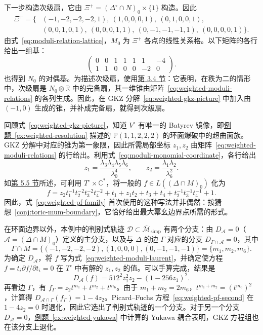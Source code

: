 \begin{example}
下一步构造次级扇，它由 $\Xi^+=(\Delta^\circ\cap N)_0\times\{1\}$ 构造。因此
\[
\begin{split}
\Xi^+=\{&(-1,-2,-2,-2,1),\ (1,0,0,0,1),\ (0,1,0,0,1),\\
&(0,0,1,0,1),\ (0,0,0,1,1),\ (0,-1,-1,-1,1),\ (0,0,0,0,1)\}.
\end{split}
\]
由式~\eqref{eq:moduli-relation-lattice}，$M_0$ 为 $\Xi^+$ 各点的线性关系格。以下矩阵的各行给出一组基：
\begin{equation}\label{eq:weighted-moduli-relations}
\begin{pmatrix}0&0&1&1&1&1&-4\\1&1&0&0&0&-2&0\end{pmatrix}.
\end{equation}
也得到 $N_0$ 的对偶基。为描述次级扇，使用\hyperref[sec:gkz-decomposition]{第 3.4 节}：它表明，在秩为二的情形中，次级扇是 $N_0\otimes\mathbb R$ 中的完备扇，其一维锥由矩阵~\eqref{eq:weighted-moduli-relations} 的各列生成。因此，在 GKZ 分解~\eqref{eq:weighted-gkz-picture} 中加入由 $(-1,0)$ 生成的锥，并补成完备扇，就得到次级扇。

回顾式~\eqref{eq:weighted-gkz-picture}，知道 $V^\circ$ 有唯一的 Batyrev 镜像，即\hyperref[ex:weighted-resolution]{例题~\ref*{ex:weighted-resolution}} 描述的 $\mathbb P(1,1,2,2,2)$ 的环面爆破中的超曲面族。GKZ 分解中对应的锥为第一象限，因此所需局部坐标 $z_1,z_2$ 由矩阵~\eqref{eq:weighted-moduli-relations} 的行给出。利用式~\eqref{eq:moduli-monomial-coordinate}，各行给出
\[
z_1=\frac{\lambda_3\lambda_4\lambda_5\lambda_6}{\lambda_0^4},\qquad
z_2=\frac{\lambda_1\lambda_2}{\lambda_6^2}.
\]
如\hyperref[sec:hypergeometric]{第 5.5 节}所述，可利用 $T^\circ\times\mathbb C^*$，将一般的 $f\in L((\Delta\cap M)_0)$ 化为
\begin{equation}\label{eq:weighted-moduli-laurent}
f=z_2t_1^{-1}t_2^{-2}t_3^{-2}t_4^{-2}+t_1+z_1t_2+t_3+t_4
+t_2^{-1}t_3^{-1}t_4^{-1}+1.
\end{equation}
因此，式~\eqref{eq:weighted-pf-family} 首次使用的这种写法并非偶然：按猜想~\ref{conj:toric-mum-boundary}，它恰好给出最大幂幺边界点所需的形式。

在环面边界以外，本例中的判别式轨迹 $\mathcal D\subset\overline{\mathcal M}_{\mathrm{simp}}$ 有两个分支：由 $D_{\mathcal A}=0$（$\mathcal A=(\Delta\cap M)_0$）定义的主分支，以及与 $\Delta$ 的边 $\Gamma$ 对应的分支 $D_{\Gamma\cap\mathcal A}=0$，其中
\[
\Gamma\cap M=\{(-1,-2,-2,-2),(1,0,0,0),(0,-1,-1,-1)\}
=\{m_1,m_2,m_6\}.
\]
为确定 $D_{\mathcal A}$，将 $f$ 写为式~\eqref{eq:weighted-moduli-laurent}，并确定使方程 $f=t_i\partial f/\partial t_i=0$ 在 $T^\circ$ 中有解的 $z_1,z_2$ 的值。可以手算完成，结果是
\[
D_{\mathcal A}(f)=512^2z_1^2z_2-(1-256z_1)^2.
\]
再看边 $\Gamma$，有 $f_\Gamma=z_2t^{m_1}+t^{m_2}+t^{m_6}$。由于 $m_1+m_2=2m_6$，$t^{m_1+m_2}=(t^{m_6})^2$，计算得 $D_{\mathcal A\cap\Gamma}(f_\Gamma)=1-4z_2$。Picard--Fuchs 方程~\eqref{eq:weighted-pf-second} 在 $1-4z_2=0$ 时退化，因此它选出了判别式轨迹的一个分支。对于另一个分支 $D_{\mathcal A}=0$，\hyperref[ex:weighted-yukawa]{例题~\ref*{ex:weighted-yukawa}} 中计算的 Yukawa 耦合表明，GKZ 方程组也在该分支上退化。
\end{example}

